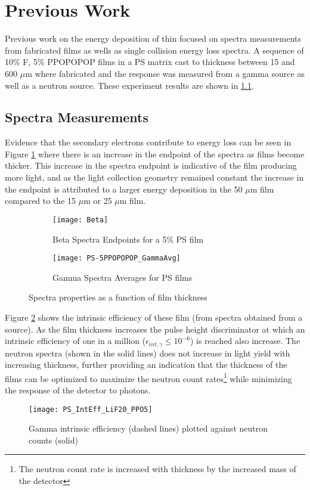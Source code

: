 
\section{Previous Work}
\label{sec:PreviousWork}
Previous work on the energy deposition of thin focused on spectra measurements from fabricated films as wells as single collision energy loss spectra.
A sequence of 10\% F, 5\% PPOPOPOP films in a PS matrix cast to thickness between 15 and 600 $\mu$m where fabricated and the response was measured from a gamma source as well as a neutron source.
These experiment results are shown in \ref{sec:SpectraMeasurements}.

\subsection{Spectra Measurements}
\label{sec:SpectraMeasurements}
Evidence that the secondary electrons contribute to energy loss can be seen in Figure \ref{fig:SpectraFeatures} where there is an increase in the endpoint of the spectra as films become thicker.
This increase in the spectra endpoint is indicative of the film producing more light, and as the light collection geometry remained constant the increase in the endpoint is attributed to a larger energy deposition in the 50 $\mu$m film compared to the 15 $\mu$m or 25 $\mu$m film.
\begin{figure}[h]
    \centering
    \begin{subfigure}[b]{0.45\figurewidth}
        \texttt{[image: Beta]}
        \caption{Beta Spectra Endpoints for a 5\% PS film}
    \end{subfigure}
    \begin{subfigure}[b]{0.45\figurewidth}
        \texttt{[image: PS-5PPOPOPOP\_GammaAvg]}
        \caption{Gamma Spectra Averages for PS films}
    \end{subfigure}
    \caption{Spectra properties as a function of film thickness}
    \label{fig:SpectraFeatures}
\end{figure}
Figure \ref{fig:GammaIntrNeutronCounts} shows the intrinsic efficiency of these film (from spectra obtained from a  source).
As the film thickness increases the pulse height discriminator at which an intrinsic efficiency of one in a million ($\epsilon_{int,\gamma} \le 10^{-6}$) is reached also increase.
The neutron spectra (shown in the solid lines) does not increase in light yield with increasing thickness, further providing an indication that the thickness of the films can be optimized to maximize the neutron count rates\footnote{The neutron count rate is increased with thickness by the increased mass of the detector} while minimizing the response of the detector to photons.
\begin{figure}[ht]
    \centering
    \texttt{[image: PS\_IntEff\_LiF20\_PPO5]}
    \caption{Gamma intrinsic efficiency (dashed lines) plotted against neutron counts (solid)}
    \label{fig:GammaIntrNeutronCounts}
\end{figure}

